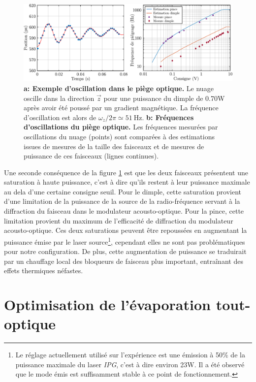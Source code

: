 \begin{figure}
\centering
\includegraphics[width=\textwidth]{../Fig/Modif_exp/frequences_piege_optique.pdf}
\caption{\textbf{a: Exemple d'oscillation dans le piège optique.} Le nuage oscille dans la direction $\vec{z}$ pour une puissance du dimple de 0.70W après avoir été poussé par un gradient magnétique. La fréquence d'oscillation est alors de $\omega_z /2\pi \simeq 51 \: \mathrm{Hz}$. \textbf{b: Fréquences d'oscillations du piège optique.} Les fréquences mesurées par oscillations du nuage (points) sont comparées à des estimations issues de mesures de la taille des faisceaux et de mesures de puissance de ces faisceaux (lignes continues).}
\label{fig:frequences_piege_optique}
\end{figure}



Une seconde conséquence de la figure \ref{fig:frequences_piege_optique} est que les deux faisceaux présentent une saturation à haute puissance, c'est à dire qu'ils restent à leur puissance maximale au dela d'une certaine consigne seuil. Pour le dimple, cette saturation provient d'une limitation de la puissance de la source de la radio-fréquence servant à la diffraction du faisceau dans le modulateur acousto-optique. Pour la pince, cette limitation provient du maximum de l'efficacité de diffraction du modulateur acousto-optique. Ces deux saturations peuvent être repoussées en augmentant la puissance émise par le laser source\footnote{Le réglage actuellement utilisé sur l'expérience est une émission à 50\% de la puissance maximale du laser \emph{IPG}, c'est à dire environ 23W. Il a été observé que le mode émis est suffisamment stable à ce point de fonctionnement.}, cependant elles ne sont pas problématiques pour notre configuration. De plus, cette augmentation de puissance se traduirait par un chauffage local des bloqueurs de faisceau plus important, entraînant des effets thermiques néfastes.





\section{Optimisation de l'évaporation tout-optique}
\label{sc:evap_optique}


